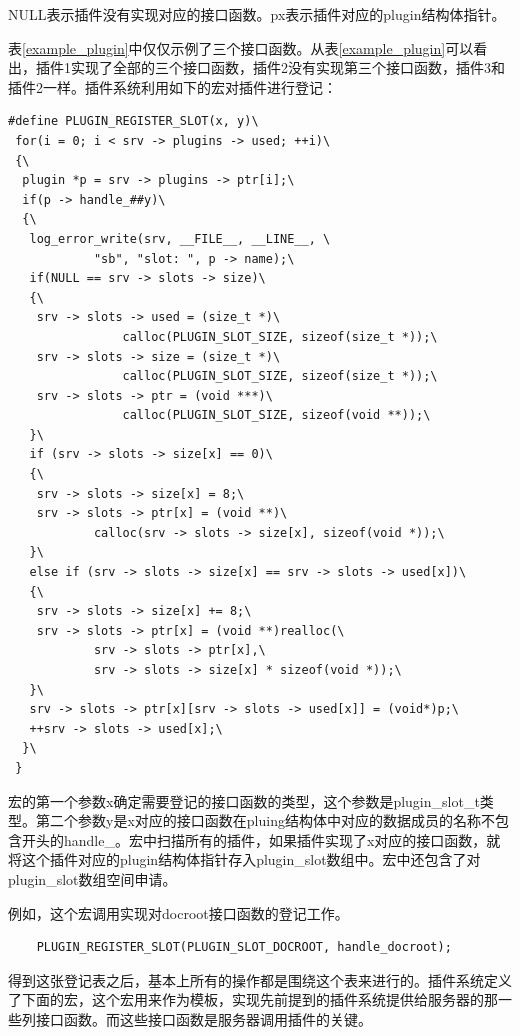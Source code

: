 \documentclass[12pt, twoside, a4paper, xetex]{report}
\begin{document}
	NULL表示插件没有实现对应的接口函数。px表示插件对应的plugin结构体指针。
	
	表\ref{example_plugin}中仅仅示例了三个接口函数。从表\ref{example_plugin}可以看出，插件1实现了全部的三个接口函数，插件2没有实现第三个接口函数，插件3和插件2一样。插件系统利用如下的宏对插件进行登记：
	
\begin{verbatim}
#define PLUGIN_REGISTER_SLOT(x, y)\
 for(i = 0; i < srv -> plugins -> used; ++i)\
 {\
  plugin *p = srv -> plugins -> ptr[i];\
  if(p -> handle_##y)\
  {\
   log_error_write(srv, __FILE__, __LINE__, \
   			"sb", "slot: ", p -> name);\
   if(NULL == srv -> slots -> size)\
   {\
    srv -> slots -> used = (size_t *)\
    			calloc(PLUGIN_SLOT_SIZE, sizeof(size_t *));\
    srv -> slots -> size = (size_t *)\
    			calloc(PLUGIN_SLOT_SIZE, sizeof(size_t *));\
	srv -> slots -> ptr = (void ***)\
				calloc(PLUGIN_SLOT_SIZE, sizeof(void **));\
   }\
   if (srv -> slots -> size[x] == 0)\
   {\
	srv -> slots -> size[x] = 8;\
	srv -> slots -> ptr[x] = (void **)\
			calloc(srv -> slots -> size[x], sizeof(void *));\
   }\
   else if (srv -> slots -> size[x] == srv -> slots -> used[x])\
   {\
	srv -> slots -> size[x] += 8;\
	srv -> slots -> ptr[x] = (void **)realloc(\
			srv -> slots -> ptr[x],\
			srv -> slots -> size[x] * sizeof(void *));\
   }\
   srv -> slots -> ptr[x][srv -> slots -> used[x]] = (void*)p;\
   ++srv -> slots -> used[x];\
  }\
 }
\end{verbatim}
	
	宏的第一个参数x确定需要登记的接口函数的类型，这个参数是plugin\_slot\_t类型。第二个参数y是x对应的接口函数在pluing结构体中对应的数据成员的名称不包含开头的handle\_。宏中扫描所有的插件，如果插件实现了x对应的接口函数，就将这个插件对应的plugin结构体指针存入plugin\_slot数组中。宏中还包含了对plugin\_slot数组空间申请。
	
	例如，这个宏调用实现对docroot接口函数的登记工作。
	\begin{verbatim}
	PLUGIN_REGISTER_SLOT(PLUGIN_SLOT_DOCROOT, handle_docroot);
	\end{verbatim}
	
	得到这张登记表之后，基本上所有的操作都是围绕这个表来进行的。插件系统定义了下面的宏，这个宏用来作为模板，实现先前提到的插件系统提供给服务器的那一些列接口函数。而这些接口函数是服务器调用插件的关键。
\end{document}
